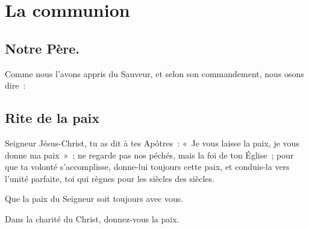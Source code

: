 





\section{La communion}

\subsection{Notre Père.}


Comme nous l'avons appris du Sauveur, et selon son commandement, nous
osons dire~:


\subsection{Rite de la paix}

Seigneur Jésus-Christ, tu as dit à tes Apôtres~: «~Je vous laisse la            
paix, je vous donne ma paix~»~; ne regarde pas nos péchés, mais la
foi de ton Église~; pour que ta volonté s'accomplisse, donne-lui
toujours cette paix, et conduis-la vers l'unité parfaite, toi qui
règnes pour les siècles des siècles.


Que la paix du Seigneur soit toujours avec vous.


Dans la charité du Christ, donnez-vous la paix.

